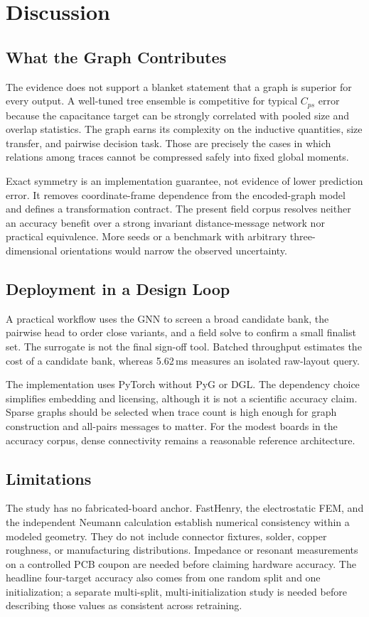 \documentclass[letterpaper,twocolumn,9pt]{extarticle}
\newcommand{\Cps}{C_{ps}}
\begin{document}
\section{Discussion}
\subsection{What the Graph Contributes}
The evidence does not support a blanket statement that a graph is superior for every output. A well-tuned tree ensemble is competitive for typical $\Cps$ error because the capacitance target can be strongly correlated with pooled size and overlap statistics. The graph earns its complexity on the inductive quantities, size transfer, and pairwise decision task. Those are precisely the cases in which relations among traces cannot be compressed safely into fixed global moments.

Exact symmetry is an implementation guarantee, not evidence of lower prediction error. It removes coordinate-frame dependence from the encoded-graph model and defines a transformation contract. The present field corpus resolves neither an accuracy benefit over a strong invariant distance-message network nor practical equivalence. More seeds or a benchmark with arbitrary three-dimensional orientations would narrow the observed uncertainty.

\subsection{Deployment in a Design Loop}
A practical workflow uses the GNN to screen a broad candidate bank, the pairwise head to order close variants, and a field solve to confirm a small finalist set. The surrogate is not the final sign-off tool. Batched throughput estimates the cost of a candidate bank, whereas 5.62\,ms measures an isolated raw-layout query.

The implementation uses PyTorch without PyG or DGL. The dependency choice simplifies embedding and licensing, although it is not a scientific accuracy claim. Sparse graphs should be selected when trace count is high enough for graph construction and all-pairs messages to matter. For the modest boards in the accuracy corpus, dense connectivity remains a reasonable reference architecture.

\subsection{Limitations}
The study has no fabricated-board anchor. FastHenry, the electrostatic FEM, and the independent Neumann calculation establish numerical consistency within a modeled geometry. They do not include connector fixtures, solder, copper roughness, or manufacturing distributions. Impedance or resonant measurements on a controlled PCB coupon are needed before claiming hardware accuracy. The headline four-target accuracy also comes from one random split and one initialization; a separate multi-split, multi-initialization study is needed before describing those values as consistent across retraining.
\end{document}

